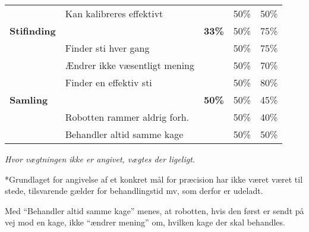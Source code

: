 \begin{footnotesize}
\begin{center}
\begin{tabular}{l | l | r r r}
	& Kan kalibreres effektivt & & 50\% & 50\% \\
	\hspace*{0.3cm}\hspace*{0.3cm} \textbf{Stifinding}
																&		&	\textbf{33\%} & 	50\% & 75\% \\
	& Finder sti hver gang & & 50\% & 75\% \\
	& Ændrer ikke væsentligt mening & & 50\% & 70\% \\
	& Finder en effektiv sti & & 50\% & 80\% \\
	\hspace*{0.3cm} \textbf{Samling}
																&		&\textbf{50\%}		& 	50\%	& 45\% \\
	& Robotten rammer aldrig forh. & & 50\% & 40\% \\
	& Behandler altid samme kage & & 50\% & 50\%
\end{tabular}
\end{center}
\end{footnotesize}
\textit{Hvor vægtningen ikke er angivet, vægtes der ligeligt.}

*Grundlaget for angivelse af et konkret mål for præcision har ikke været  været til stede, tilsvarende gælder for behandlingstid mv, som derfor er udeladt.

Med "`Behandler altid samme kage"' menes, at robotten, hvis den først er sendt på vej mod en kage, ikke "`ændrer mening"' om, hvilken kage der skal behandles.
